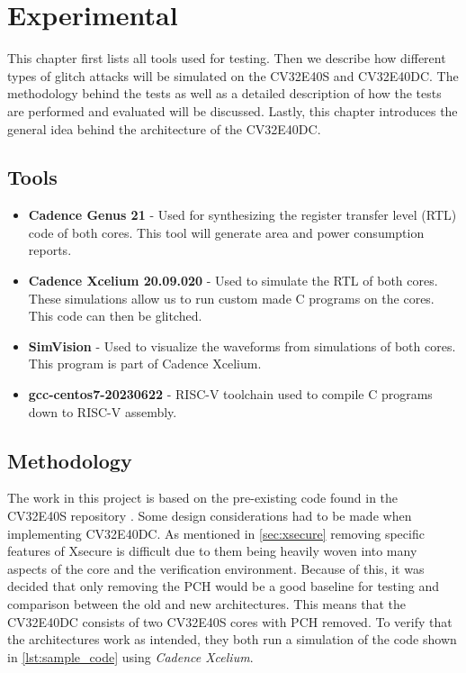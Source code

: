 \chapter{Experimental}
\label{chap4}

This chapter first lists all tools used for testing. Then we describe how different types of glitch attacks will be simulated on the CV32E40S and CV32E40DC. The methodology behind the tests as well as a detailed description of how the tests are performed and evaluated will be discussed. Lastly, this chapter introduces the general idea behind the architecture of the CV32E40DC. 

\section{Tools}
\label{sec:tools}

\begin{itemize}
    \item \textbf{Cadence Genus 21}\cite{cadence} - Used for synthesizing the register transfer level (RTL) code of both cores. This tool will generate area and power consumption reports. 
    \item \textbf{Cadence Xcelium 20.09.020}\cite{xcelium} - Used to simulate the RTL of both cores. These simulations allow us to run custom made C programs on the cores. This code can then be glitched.
    \item \textbf{SimVision} \cite{simvision} - Used to visualize the waveforms from simulations of both cores. This program is part of Cadence Xcelium.
    \item \textbf{gcc-centos7-20230622}\cite{toolchain} - RISC-V toolchain used to compile C programs down to RISC-V assembly. 
\end{itemize}

\section{Methodology}
\label{sec:method}

The work in this project is based on the pre-existing code found in the CV32E40S repository \cite{cv32e40s_github}. Some design considerations had to be made when implementing CV32E40DC. As mentioned in \autoref{sec:xsecure} removing specific features of Xsecure is difficult due to them being heavily woven into many aspects of the core and the verification environment. Because of this, it was decided that only removing the PCH would be a good baseline for testing and comparison between the old and new architectures. This means that the CV32E40DC consists of two CV32E40S cores with PCH removed. To verify that the architectures work as intended, they both run a simulation of the code shown in \autoref{lst:sample_code} using \textit{Cadence Xcelium}. 

